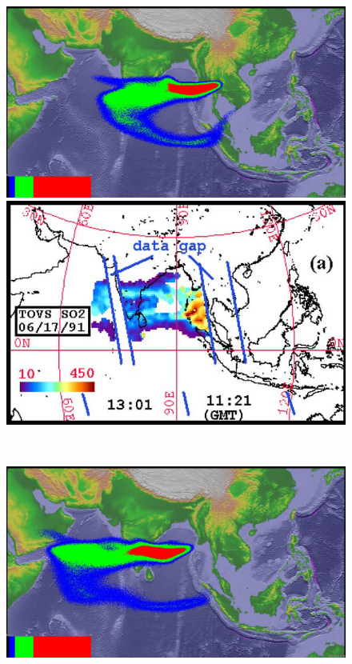 \begin{figure}[!htb]
\begin{minipage}{.325 \textwidth}
    \end{minipage}%
\\
    \begin{minipage}{.325\textwidth}
        \centering
        \includegraphics[width=0.99 \textwidth]{Chapter-7/Figures/SPH-Plume-55hr-ash}
    \end{minipage}%
    \begin{minipage}{.325 \textwidth}
        \centering
        \includegraphics[width=0.99 \textwidth]{Chapter-7/Figures/OB-SO2-55hr-ash}
    \end{minipage}%
\\
    \begin{minipage}{.325\textwidth}
        \centering
        \includegraphics[width=0.99 \textwidth]{Chapter-7/Figures/SPH-Plume-73hr-ash}

\end{minipage}
\end{figure}
